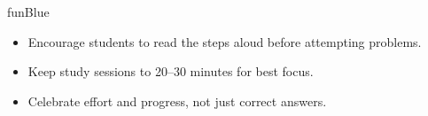 {\begin{center}
\begin{minipage}{0.84\textwidth}
\begin{stInfoPanel}{funBlue}
    \vspace{2mm}

    \begin{itemize}[leftmargin=1.2em, itemsep=2pt]
        \item[\textcolor{funBlueDark}{\faAngleDoubleRight}]
            Encourage students to read the steps aloud before
            attempting problems.
        \item[\textcolor{funBlueDark}{\faAngleDoubleRight}]
            Keep study sessions to 20--30 minutes for best focus.
        \item[\textcolor{funBlueDark}{\faAngleDoubleRight}]
            Celebrate effort and progress, not just correct answers.
    \end{itemize}
\end{stInfoPanel}
\end{minipage}
\end{center}

}

\clearpage
